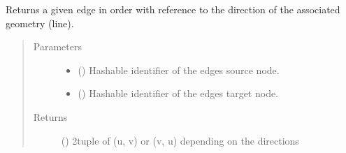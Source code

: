 \documentclass[letterpaper,10pt,english]{sphinxmanual}
\begin{document}
\begin{fulllineitems}
\begin{fulllineitems}
\begin{quote}
\begin{description}
\end{description}\end{quote}

\end{fulllineitems}


\begin{fulllineitems}
\label{\detokenize{cockatoo:cockatoo.KnitNetworkBase.edge_geometry_direction}}
Returns a given edge in order with reference to the direction of the
associated geometry (line).
\begin{quote}\begin{description}
\item[{Parameters}] \leavevmode\begin{itemize}
\item {} 
 () \textendash{} Hashable identifier of the edges source node.

\item {} 
 () \textendash{} Hashable identifier of the edges target node.

\end{itemize}

\item[{Returns}] \leavevmode
{} () \textendash{} 2\sphinxhyphen{}tuple of (u, v) or (v, u) depending on the directions

\end{description}\end{quote}

\end{fulllineitems}



\end{fulllineitems}
\end{document}
